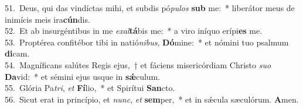 {51.~}Deus, qui das vindíctas mihi, et subdis pó\textit{pu}\textit{los} \textbf{sub} me:~* liberátor meus de inimícis meis ira\textbf{cún}dis.\\
{52.~}Et ab insurgéntibus in me \textit{e}\textit{xal}\textbf{tá}bis me:~* a viro iníquo erípi\textbf{es} me.\\
{53.~}Proptérea confitébor tibi in natió\textit{ni}\textit{bus}, \textbf{Dó}mine:~* et nómini tuo psalmum \textbf{di}cam.\\
{54.~}Magníficans salútes Regis ejus,~† et fáciens misericórdiam Christo \textit{su}\textit{o} \textbf{Da}vid:~* et sémini ejus usque in \textbf{sǽ}culum.\\
{55.~}Glória Pa\textit{tri}, \textit{et} \textbf{Fí}lio,~* et Spirítui \textbf{San}cto.\\
{56.~}Sicut erat in princípio, et \textit{nunc}, \textit{et} \textbf{sem}per,~* et in sǽcula sæculórum. \textbf{A}men.\\
